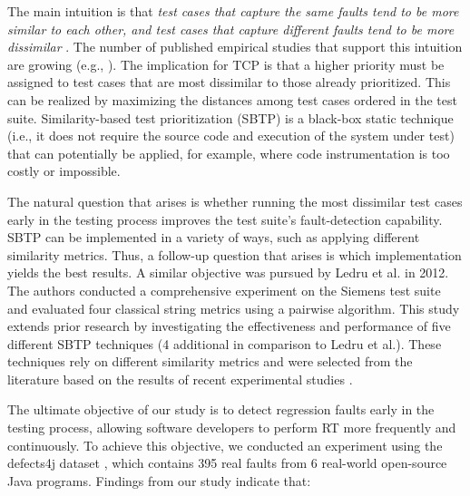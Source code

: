 \documentclass[runningheads]{llncs}
\begin{document}
The main intuition is that \textit{test cases that capture the same faults tend to be more similar to each other, and test cases that capture different faults tend to be more dissimilar} \cite{jiang2009adaptive,hemmati2010reducing,ledru2012prioritizing}. The number of published empirical studies that support this intuition are growing (e.g., \cite{hemmati2013achieving,hemmati2017prioritizing,arafeen2013test,thomas2014static,feldt2016test,flemstrom2017similarity}). The implication for TCP is that a higher priority must be assigned to test cases that are most dissimilar to those already prioritized. This can be realized by maximizing the distances among test cases ordered in the test suite. Similarity-based test prioritization (SBTP) is a black-box static technique (i.e., it does not require the source code and execution of the system under test) that can potentially be applied, for example, where code instrumentation is too costly or impossible.

The natural question that arises is whether running the most dissimilar test cases early in the testing process improves the test suite's fault-detection capability. SBTP can be implemented in a variety of ways, such as applying different similarity metrics. Thus, a follow-up question that arises is which implementation yields the best results. A similar objective was pursued by Ledru et al. \cite{ledru2012prioritizing} in 2012. The authors conducted a comprehensive experiment on the Siemens test suite and evaluated four classical string metrics using a pairwise algorithm. This study extends prior research by investigating the effectiveness and performance of five different SBTP techniques (4 additional in comparison to Ledru et al.). These techniques rely on different similarity metrics and were selected from the literature based on the results of recent experimental studies \cite{feldt2008searching,hemmati2010industrial,feldt2016test,ledru2012prioritizing,miranda2018fast}.


The ultimate objective of our study is to detect regression faults early in the testing process, allowing software developers to perform RT more frequently and continuously. To achieve this objective, we conducted an experiment using the defects4j dataset \cite{just2014defects4j}, which contains 395 real faults from 6 real-world open-source Java programs. Findings from our study indicate that:
\end{document}
